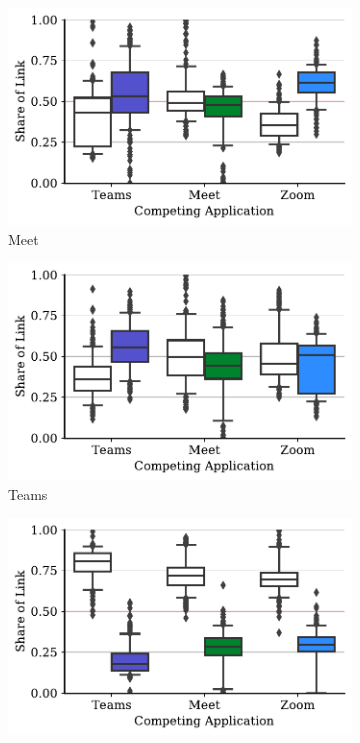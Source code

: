 \begin{figure}[t!]
    \centering
    \begin{subfigure}[t]{.33\textwidth}
        \centering
        \includegraphics[width=1\textwidth]{figures/comp/box_plot_meet_ul_0.5_all.pdf}
        \caption{Meet}
        \label{fig:meet_ul_box}
    \end{subfigure}\hfill
    \begin{subfigure}[t]{.33\textwidth}
        \centering
        \includegraphics[width=1\textwidth]{figures/comp/box_plot_teams_ul_0.5_all.pdf}
        \caption{Teams}
        \label{fig:teams_ul_box}
    \end{subfigure}
    \begin{subfigure}[t]{.33\textwidth}
        \centering
        \includegraphics[width=1\textwidth]{figures/comp/box_plot_zoom_ul_0.5_all.pdf}

\end{subfigure}
\end{figure}
